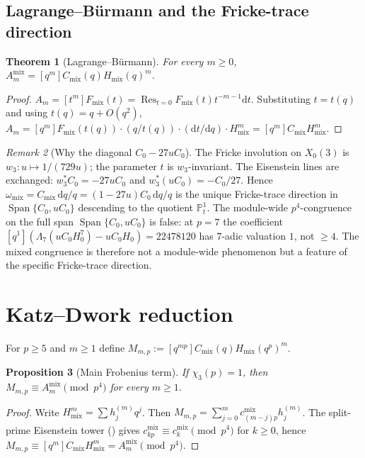 \documentclass[11pt]{amsart}
\newtheorem{theorem}{Theorem}[section]
\newtheorem{proposition}[theorem]{Proposition}
\theoremstyle{definition}
\theoremstyle{remark}
\newtheorem{remark}[theorem]{Remark}
\newcommand{\dd}{\mathrm{d}}
\newcommand{\Res}{\operatorname{Res}}
\newcommand{\Span}{\operatorname{Span}}
\begin{document}
\subsection{Lagrange--B\"urmann and the Fricke-trace direction}

\begin{theorem}[Lagrange--B\"urmann]\label{thm:LB}
For every $m\ge 0$, $A_m^{\mathrm{mix}}=[q^m]C_{\mathrm{mix}}(q)H_{\mathrm{mix}}(q)^m$.
\end{theorem}

\begin{proof}
$A_m=[t^m]F_{\mathrm{mix}}(t)=\Res_{t=0}F_{\mathrm{mix}}(t)t^{-m-1}\dd t$. Substituting $t=t(q)$ and using $t(q)=q+O(q^2)$,
$A_m=[q^m]F_{\mathrm{mix}}(t(q))\cdot(q/t(q))\cdot(\dd t/\dd q)\cdot H_{\mathrm{mix}}^m=[q^m]C_{\mathrm{mix}}H_{\mathrm{mix}}^m$.
\end{proof}

\begin{remark}[Why the diagonal $C_0-27uC_0$]\label{rem:fricke-trace-line}
The Fricke involution on $X_0(3)$ is $w_3:u\mapsto 1/(729u)$; the parameter $t$ is $w_3$-invariant. The Eisenstein lines are exchanged: $w_3^*C_0=-27uC_0$ and $w_3^*(uC_0)=-C_0/27$. Hence $\omega_{\mathrm{mix}}=C_{\mathrm{mix}}\,\dd q/q=(1-27u)C_0\,\dd q/q$ is the unique Fricke-trace direction in $\Span\{C_0,uC_0\}$ descending to the quotient $\mathbb P^1_t$. The module-wide $p^4$-congruence on the full span $\Span\{C_0,uC_0\}$ is false: at $p=7$ the coefficient $[q^1](\Lambda_7(uC_0H_0^7)-uC_0H_0)=22478120$ has $7$-adic valuation $1$, not $\ge 4$. The mixed congruence is therefore not a module-wide phenomenon but a feature of the specific Fricke-trace direction.
\end{remark}

\section{Katz--Dwork reduction}\label{sec:KD}

For $p\ge 5$ and $m\ge 1$ define $M_{m,p}:=[q^{mp}]C_{\mathrm{mix}}(q)H_{\mathrm{mix}}(q^p)^m$.

\begin{proposition}[Main Frobenius term]\label{prop:mainfrobenius}
If $\chi_3(p)=1$, then $M_{m,p}\equiv A_m^{\mathrm{mix}}\pmod{p^4}$ for every $m\ge 1$.
\end{proposition}

\begin{proof}
Write $H_{\mathrm{mix}}^m=\sum h_j^{(m)}q^j$. Then $M_{m,p}=\sum_{j=0}^m c_{(m-j)p}^{\mathrm{mix}}h_j^{(m)}$. The split-prime Eisenstein tower () gives $c_{kp}^{\mathrm{mix}}\equiv c_k^{\mathrm{mix}}\pmod{p^4}$ for $k\ge 0$, hence $M_{m,p}\equiv [q^m]C_{\mathrm{mix}}H_{\mathrm{mix}}^m=A_m^{\mathrm{mix}}\pmod{p^4}$.
\end{proof}
\end{document}
